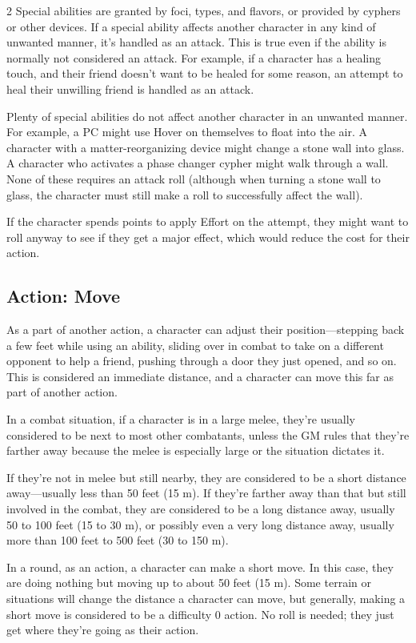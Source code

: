\begin{multicols}{2}
Special abilities are granted by foci, types, and flavors, or provided by cyphers or other devices. If a special ability affects another character in any kind of unwanted manner, it’s handled as an attack. This is true even if the ability is normally not considered an attack. For example, if a character has a healing touch, and their friend doesn’t want to be healed for some reason, an attempt to heal their unwilling friend is handled as an attack.

Plenty of special abilities do not affect another character in an unwanted manner. For example, a PC might use Hover on themselves to float into the air. A character with a matter-reorganizing device might change a stone wall into glass. A character who activates a phase changer cypher might walk through a wall. None of these requires an attack roll (although when turning a stone wall to glass, the character must still make a roll to successfully affect the wall).

If the character spends points to apply Effort on the attempt, they might want to roll anyway to see if they get a major effect, which would reduce the cost for their action.

\subsection{Action: Move}

As a part of another action, a character can adjust their position—stepping back a few feet while using an ability, sliding over in combat to take on a different opponent to help a friend, pushing through a door they just opened, and so on. This is considered an immediate distance, and a character can move this far as part of another action.

In a combat situation, if a character is in a large melee, they’re usually considered to be next to most other combatants, unless the GM rules that they’re farther away because the melee is especially large or the situation dictates it.

If they’re not in melee but still nearby, they are considered to be a short distance away—usually less than 50 feet (15 m). If they’re farther away than that but still involved in the combat, they are considered to be a long distance away, usually 50 to 100 feet (15 to 30 m), or possibly even a very long distance away, usually more than 100 feet to 500 feet (30 to 150 m).

In a round, as an action, a character can make a short move. In this case, they are doing nothing but moving up to about 50 feet (15 m). Some terrain or situations will change the distance a character can move, but generally, making a short move is considered to be a difficulty 0 action. No roll is needed; they just get where they’re going as their action.


\end{multicols}

